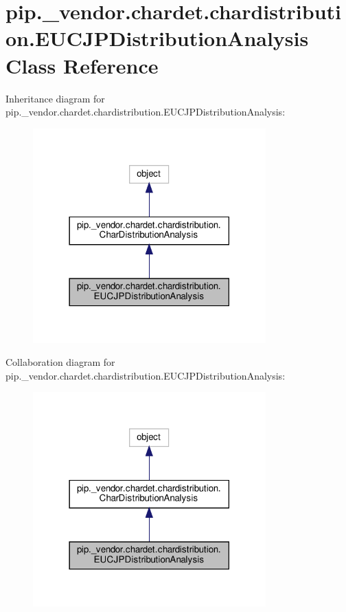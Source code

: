 \hypertarget{classpip_1_1__vendor_1_1chardet_1_1chardistribution_1_1EUCJPDistributionAnalysis}{}\section{pip.\+\_\+vendor.\+chardet.\+chardistribution.\+E\+U\+C\+J\+P\+Distribution\+Analysis Class Reference}
\label{classpip_1_1__vendor_1_1chardet_1_1chardistribution_1_1EUCJPDistributionAnalysis}


Inheritance diagram for pip.\+\_\+vendor.\+chardet.\+chardistribution.\+E\+U\+C\+J\+P\+Distribution\+Analysis\+:
\nopagebreak
\begin{figure}[H]
\begin{center}
\leavevmode
\includegraphics[width=254pt]{classpip_1_1__vendor_1_1chardet_1_1chardistribution_1_1EUCJPDistributionAnalysis__inherit__graph}
\end{center}
\end{figure}


Collaboration diagram for pip.\+\_\+vendor.\+chardet.\+chardistribution.\+E\+U\+C\+J\+P\+Distribution\+Analysis\+:
\nopagebreak
\begin{figure}[H]
\begin{center}
\leavevmode
\includegraphics[width=254pt]{classpip_1_1__vendor_1_1chardet_1_1chardistribution_1_1EUCJPDistributionAnalysis__coll__graph}
\end{center}
\end{figure}

